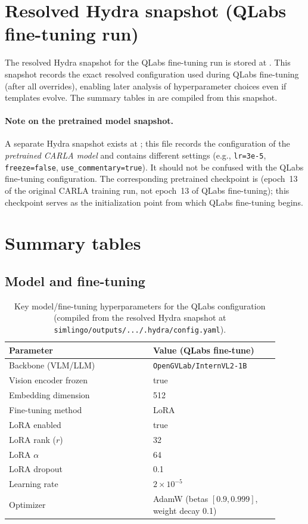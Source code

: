 \section{Resolved Hydra snapshot (QLabs fine-tuning run)}
The resolved Hydra snapshot for the QLabs fine-tuning run is stored at . This snapshot records the exact resolved configuration used during QLabs fine-tuning (after all overrides), enabling later analysis of hyperparameter choices even if templates evolve. The summary tables in  are compiled from this snapshot.

\paragraph{Note on the pretrained model snapshot.}
A separate Hydra snapshot exists at ; this file records the configuration of the \emph{pretrained CARLA model} and contains different settings (e.g., \texttt{lr=3e-5}, \texttt{freeze=false}, \texttt{use\_commentary=true}). It should not be confused with the QLabs fine-tuning configuration. The corresponding pretrained checkpoint is  (epoch~13 of the original CARLA training run, not epoch~13 of QLabs fine-tuning); this checkpoint serves as the initialization point from which QLabs fine-tuning begins.

\section{Summary tables}
\subsection{Model and fine-tuning}
\begin{table}[h]
\centering
\caption{Key model/fine-tuning hyperparameters for the QLabs configuration (compiled from the resolved Hydra snapshot at \texttt{simlingo/outputs/.../\allowbreak .hydra/config.yaml}).}
\label{tab:hparams-model}
\begin{tabular}{p{0.48\linewidth}p{0.42\linewidth}}
\toprule
Parameter & Value (QLabs fine-tune)\\
\midrule
Backbone (VLM/LLM) & \texttt{OpenGVLab/InternVL2-1B}\\
Vision encoder frozen & true\\
Embedding dimension & 512\\
Fine-tuning method & LoRA\\
LoRA enabled & true\\
LoRA rank ($r$) & 32\\
LoRA $\alpha$ & 64\\
LoRA dropout & 0.1\\
Learning rate & $2\times 10^{-5}$\\
Optimizer & AdamW (betas $[0.9, 0.999]$, weight decay 0.1)\\
\bottomrule
\end{tabular}
\end{table}

